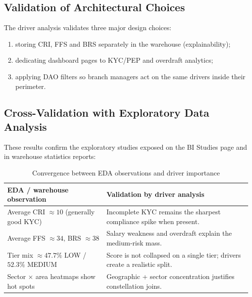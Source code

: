 \subsection{Validation of Architectural Choices}
The driver analysis validates three major design choices:
\begin{enumerate}
    \item storing CRI, FFS and BRS separately in the warehouse (explainability);
    \item dedicating dashboard pages to KYC/PEP and overdraft analytics;
    \item applying DAO filters so branch managers act on the same drivers inside
          their perimeter.
\end{enumerate}

\subsection{Cross-Validation with Exploratory Data Analysis}
These results confirm the exploratory studies exposed on the BI Studies page and
in warehouse statistics reports:

\begin{table}[H]
\centering
\caption{Convergence between EDA observations and driver importance}
\label{tab:eda-importance-convergence}
\renewcommand{\arraystretch}{1.2}
\scriptsize
\begin{tabular}{|p{6.2cm}|p{7.5cm}|}
\hline
\rowcolor{blue!15}
\textbf{EDA / warehouse observation} & \textbf{Validation by driver analysis} \\
\hline
Average CRI $\approx 10$ (generally good KYC) & Incomplete KYC remains the sharpest compliance spike when present. \\
\hline
Average FFS $\approx 34$, BRS $\approx 38$ & Salary weakness and overdraft explain the medium-risk mass. \\
\hline
Tier mix $\approx 47.7\%$ LOW / $52.3\%$ MEDIUM & Score is not collapsed on a single tier; drivers create a realistic split. \\
\hline
Sector $\times$ area heatmaps show hot spots & Geographic + sector concentration justifies constellation joins. \\
\hline
\end{tabular}
\end{table}

